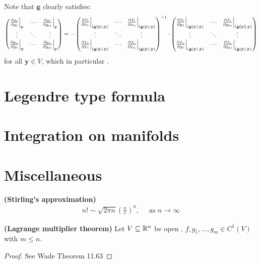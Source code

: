 \documentclass{report}
\begin{document}
Note that $\textbf{g}$ clearly satisfies:
    \begin{align*}
\begin{pmatrix} 
  \frac{\partial g_1}{\partial y_1} \Big|_{\textbf{y}} & \cdots & \frac{\partial g_1}{\partial y_m} \Big|_{\textbf{y}} \\
  \vdots & \ddots & \vdots \\
  \frac{\partial g_n}{\partial y_1} \Big|_{\textbf{y}} & \cdots & \frac{\partial g_n}{\partial y_m} \Big|_{\textbf{y}}
\end{pmatrix} = -  
\begin{pmatrix} 
  \frac{\partial f_1}{\partial x_1} \Big  |_{(\textbf{g}(\textbf{y}),\textbf{y})} & \cdots & \frac{\partial f_1}{\partial x_n} \Big |_{(\textbf{g}(\textbf{y}),\textbf{y})}  \\
  \vdots & \ddots & \vdots \\
  \frac{\partial f_n}{\partial x_1} \Big|_{(\textbf{g}(\textbf{y}),\textbf{y})} & \cdots & \frac{\partial f_n}{\partial x_n} \Big  |_{(\textbf{g}(\textbf{y}),\textbf{y})} 
\end{pmatrix}^{-1} \cdot \begin{pmatrix} 
  \frac{\partial f_1}{\partial y_1} \Big|_{(\textbf{g}(\textbf{y}),\textbf{y})} & \cdots & \frac{\partial f_1}{\partial y_m}  \Big |_{(\textbf{g(\textbf{y})},\textbf{y})} \\
  \vdots & \ddots & \vdots \\
  \frac{\partial f_n}{\partial y_1} \Big|_{(\textbf{g}(\textbf{y}),\textbf{y})} & \cdots & \frac{\partial f_n}{\partial y_m}  \Big |_{(\textbf{g}(\textbf{y}),\textbf{y})} 
\end{pmatrix}
\end{align*}
for all $\textbf{y} \in V$, which in particular . 
\section{Legendre type formula}
\section{Integration on manifolds}
\section{Miscellaneous}
\begin{theorem}
\label{THSa}
\textbf{(Stirling's approximation)} 
\begin{align*}
n!\sim \sqrt{2\pi n} \left(\frac{n}{e} \right)^n  ,\quad \text{ as }n\rightarrow \infty
\end{align*}
\end{theorem}
\begin{theorem}
\textbf{(Lagrange multiplier theorem)} Let $V \subseteq \mathbb{R}^n$ be open , $f,g_1,\dots ,g_m \in C^1(V)$ with $m\leq n$. 
\end{theorem}
\begin{proof}
See Wade Theorem 11.63
\end{proof}
\end{document}
